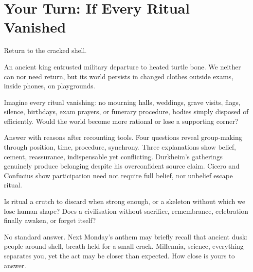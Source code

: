 \section{Your Turn: If Every Ritual Vanished}
Return to the cracked shell.

An ancient king entrusted military departure to heated turtle bone. We neither can nor need return, but its world persists in changed clothes outside exams, inside phones, on playgrounds.

Imagine every ritual vanishing: no mourning halls, weddings, grave visits, flags, silence, birthdays, exam prayers, or funerary procedure, bodies simply disposed of efficiently. Would the world become more rational or lose a supporting corner?

Answer with reasons after recounting tools. Four questions reveal group-making through position, time, procedure, synchrony. Three explanations show belief, cement, reassurance, indispensable yet conflicting. Durkheim's gatherings genuinely produce belonging despite his overconfident source claim. Cicero and Confucius show participation need not require full belief, nor unbelief escape ritual.

Is ritual a crutch to discard when strong enough, or a skeleton without which we lose human shape? Does a civilisation without sacrifice, remembrance, celebration finally awaken, or forget itself?

No standard answer. Next Monday's anthem may briefly recall that ancient dusk: people around shell, breath held for a small crack. Millennia, science, everything separates you, yet the act may be closer than expected. How close is yours to answer.
